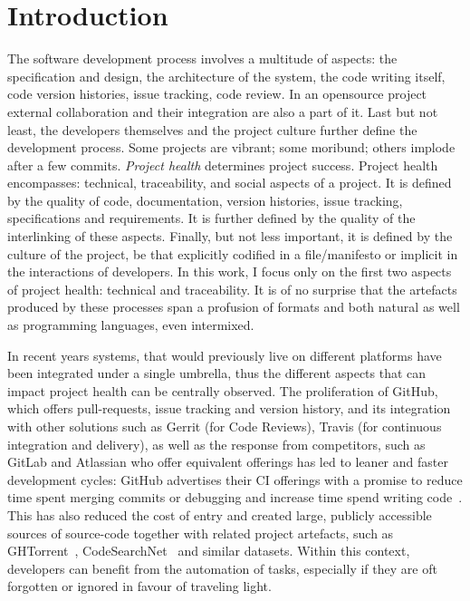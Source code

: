 \chapter{Introduction}
\label{chapter:introduction}

The software development process involves a multitude of aspects: the
specification and design, the architecture of the system, the code writing
itself, code version histories, issue tracking, code review. In an opensource
project external collaboration and their integration are also a part of it. Last
but not least, the developers themselves and the project culture further define
the development process. Some projects are vibrant; some moribund; others
implode after a few commits. \emph{Project health} determines project success.
Project health encompasses: technical, traceability, and social aspects of a
project. It is defined by the quality of code, documentation, version histories,
issue tracking, specifications and requirements. It is further defined by the
quality of the interlinking of these aspects. Finally, but not less important,
it is defined by the culture of the project, be that explicitly codified in a
file/manifesto or implicit in the interactions of developers. In this work, I
focus only on the first two aspects of project health: technical and
traceability. It is of no surprise that the artefacts produced by these
processes span a profusion of formats and both natural as well as programming
languages, even intermixed.

In recent years systems, that would previously live on different platforms have
been integrated under a single umbrella, thus the different aspects that can
impact project health can be centrally observed. The proliferation of GitHub,
which offers pull-requests, issue tracking and version history, and its
integration with other solutions such as Gerrit (for Code Reviews), Travis (for
continuous integration and delivery), as well as the response from competitors,
such as GitLab and Atlassian who offer equivalent offerings has led to leaner
and faster development cycles: GitHub advertises their CI offerings with a
promise to reduce time spent merging commits or debugging and increase time
spend writing code~\cite{GitHubCI}. This has also reduced the cost of entry and
created large, publicly accessible sources of source-code together with related
project artefacts, such as GHTorrent~\cite{GHTorrent},
CodeSearchNet~\cite{Husain2019} and similar datasets. Within this context,
developers can benefit from the automation of tasks, especially if they are oft
forgotten or ignored in favour of traveling light. 

